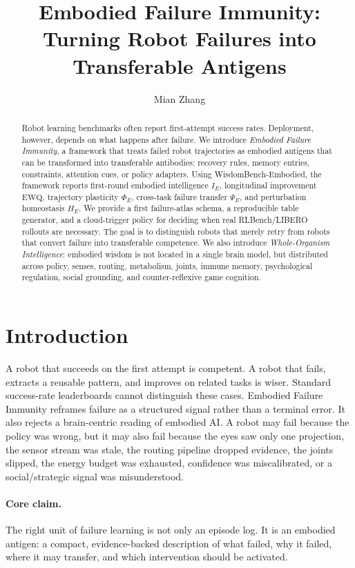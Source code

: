 \documentclass[11pt]{article}
\title{Embodied Failure Immunity: Turning Robot Failures into Transferable Antigens}
\author{Mian Zhang}
\date{}
\begin{document}
\maketitle

\begin{abstract}
Robot learning benchmarks often report first-attempt success rates.
Deployment, however, depends on what happens after failure.
We introduce \emph{Embodied Failure Immunity}, a framework that treats failed robot trajectories as embodied antigens that can be transformed into transferable antibodies: recovery rules, memory entries, constraints, attention cues, or policy adapters.
Using WisdomBench-Embodied, the framework reports first-round embodied intelligence $I_E$, longitudinal improvement $\mathrm{EWQ}$, trajectory plasticity $\Phi_E$, cross-task failure transfer $\Psi_E$, and perturbation homeostasis $H_E$.
We provide a first failure-atlas schema, a reproducible table generator, and a cloud-trigger policy for deciding when real RLBench/LIBERO rollouts are necessary.
The goal is to distinguish robots that merely retry from robots that convert failure into transferable competence.
We also introduce \emph{Whole-Organism Intelligence}: embodied wisdom is not located in a single brain model, but distributed across policy, senses, routing, metabolism, joints, immune memory, psychological regulation, social grounding, and counter-reflexive game cognition.
\end{abstract}

\section{Introduction}

A robot that succeeds on the first attempt is competent.
A robot that fails, extracts a reusable pattern, and improves on related tasks is wiser.
Standard success-rate leaderboards cannot distinguish these cases.
Embodied Failure Immunity reframes failure as a structured signal rather than a terminal error.
It also rejects a brain-centric reading of embodied AI.
A robot may fail because the policy was wrong, but it may also fail because the eyes saw only one projection, the sensor stream was stale, the routing pipeline dropped evidence, the joints slipped, the energy budget was exhausted, confidence was miscalibrated, or a social/strategic signal was misunderstood.

\paragraph{Core claim.}
The right unit of failure learning is not only an episode log.
It is an embodied antigen: a compact, evidence-backed description of what failed, why it failed, where it may transfer, and which intervention should be activated.
\end{document}
